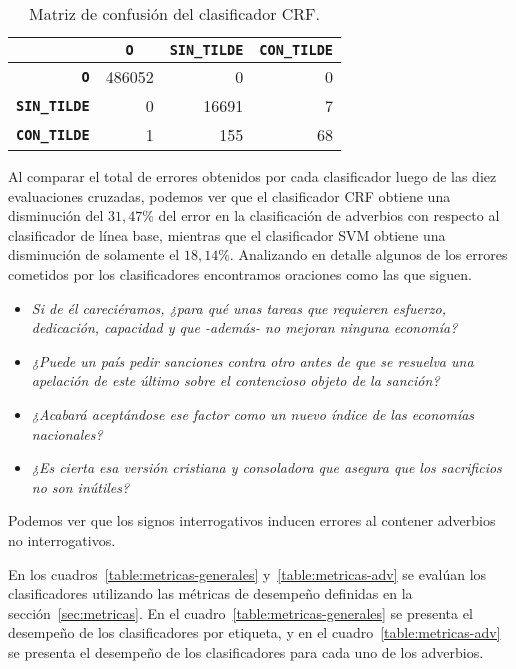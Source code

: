 \documentclass[runningheads,a4paper]{llncs}
\begin{document}
\begin{table}[ht]
	\addtolength{\abovecaptionskip}{-10mm}
 	\renewcommand{\arraystretch}{1.3}
	\renewcommand{\tabcolsep}{3pt}
	\caption{Matriz de confusión del clasificador CRF.}
	\label{table:confusion-crf}
	\centering
	\begin{tabular}{|r||r|r|r|}
		\hline
			& \multicolumn{1}{c|}{\textbf{\texttt{~O~}}}
			& \multicolumn{1}{c|}{\textbf{\texttt{SIN\_TILDE}}}
			& \multicolumn{1}{c|}{\textbf{\texttt{CON\_TILDE}}} \\
		\hline\hline
		\textbf{\texttt{O}} & 486052 & 0 & 0 \\ \hline
		\textbf{\texttt{SIN\_TILDE}} & 0 & 16691 & 7 \\ \hline
		\textbf{\texttt{CON\_TILDE}} & 1 & 155 & 68 \\ 
		\hline
	\end{tabular}
\end{table}

Al comparar el total de errores obtenidos por cada clasificador luego de las diez  evaluaciones cruzadas, podemos ver que el clasificador CRF obtiene una disminución del $31,47\%$ del error en la clasificación de adverbios con respecto al clasificador de línea base, mientras que el clasificador SVM obtiene una disminución de solamente el $18,14\%$. Analizando en detalle algunos de los errores cometidos por los clasificadores encontramos oraciones como las que siguen.
\begin{itemize}
\item{\emph{Si de él careciéramos, ¿para qué unas tareas que requieren esfuerzo, dedicación, capacidad y que -además- no mejoran ninguna economía?}}
\item{\emph{¿Puede un país pedir sanciones contra otro antes de que se resuelva una apelación de este último sobre el contencioso objeto de la sanción?}}
\item{\emph{¿Acabará aceptándose ese factor como un nuevo índice de las economías nacionales?}}
\item{\emph{¿Es cierta esa versión cristiana y consoladora que asegura que los sacrificios no son inútiles?}}
\end{itemize}
Podemos ver que los signos interrogativos inducen errores al contener adverbios no interrogativos.

En los cuadros~\ref{table:metricas-generales} y~\ref{table:metricas-adv} se evalúan los clasificadores utilizando las métricas de desempeño definidas en la secci\'on~\ref{sec:metricas}. En el cuadro~\ref{table:metricas-generales} se presenta el desempeño de los clasificadores por etiqueta, y en el cuadro~\ref{table:metricas-adv} se presenta el desempeño de los clasificadores para cada uno de los adverbios.
\end{document}
